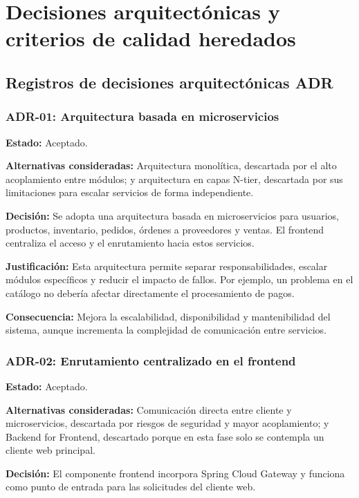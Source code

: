 \documentclass[12pt]{article}
\begin{document}
    \section{Decisiones arquitectónicas y criterios de calidad heredados}

    \subsection{Registros de decisiones arquitectónicas ADR}

    \subsubsection{ADR-01: Arquitectura basada en microservicios}

    \textbf{Estado:} Aceptado.

    \textbf{Alternativas consideradas:} Arquitectura monolítica, descartada por el alto acoplamiento entre módulos; y arquitectura en capas N-tier, descartada por sus limitaciones para escalar servicios de forma independiente.

    \textbf{Decisión:} Se adopta una arquitectura basada en microservicios para usuarios, productos, inventario, pedidos, órdenes a proveedores y ventas. El frontend centraliza el acceso y el enrutamiento hacia estos servicios.

    \textbf{Justificación:} Esta arquitectura permite separar responsabilidades, escalar módulos específicos y reducir el impacto de fallos. Por ejemplo, un problema en el catálogo no debería afectar directamente el procesamiento de pagos.

    \textbf{Consecuencia:} Mejora la escalabilidad, disponibilidad y mantenibilidad del sistema, aunque incrementa la complejidad de comunicación entre servicios.

    \subsubsection{ADR-02: Enrutamiento centralizado en el frontend}

    \textbf{Estado:} Aceptado.

    \textbf{Alternativas consideradas:} Comunicación directa entre cliente y microservicios, descartada por riesgos de seguridad y mayor acoplamiento; y Backend for Frontend, descartado porque en esta fase solo se contempla un cliente web principal.

    \textbf{Decisión:} El componente frontend incorpora Spring Cloud Gateway y funciona como punto de entrada para las solicitudes del cliente web.
\end{document}
